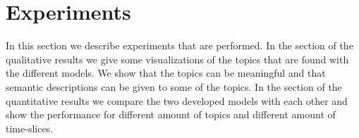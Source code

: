 \documentclass[a4paper,fleqn]{article}
\begin{document}
% 
% 
% 
% 
% 
% 



\pagebreak

\section{Experiments}
\label{sec:Experiments}
In this section we describe experiments that are performed. In the section of the qualitative results we give some visualizations of the topics that are found with the different models. We show that the topics can be meaningful and that semantic descriptions can be given to some of the topics.
In the section of the quantitative results we compare the two developed models with each other and show the performance for different amount of topics and different amount of time-slices.
\end{document}
